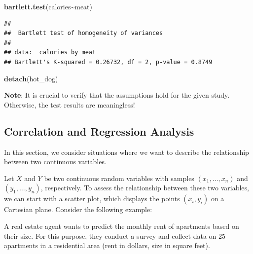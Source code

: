 \documentclass[
]{article}
\newenvironment{Shaded}{\begin{snugshade}}{\end{snugshade}}
\newcommand{\FunctionTok}[1]{\textcolor[rgb]{0.13,0.29,0.53}{\textbf{#1}}}
\newcommand{\NormalTok}[1]{#1}
\newcommand{\SpecialCharTok}[1]{\textcolor[rgb]{0.81,0.36,0.00}{\textbf{#1}}}
\begin{document}
\begin{Shaded}
\begin{Highlighting}[]
\FunctionTok{bartlett.test}\NormalTok{(calories}\SpecialCharTok{\textasciitilde{}}\NormalTok{meat)}
\end{Highlighting}
\end{Shaded}

\begin{verbatim}
## 
##  Bartlett test of homogeneity of variances
## 
## data:  calories by meat
## Bartlett's K-squared = 0.26732, df = 2, p-value = 0.8749
\end{verbatim}

\begin{Shaded}
\begin{Highlighting}[]
\FunctionTok{detach}\NormalTok{(hot\_dog)}
\end{Highlighting}
\end{Shaded}

\textbf{Note}: It is crucial to verify that the assumptions hold for the
given study. Otherwise, the test results are meaningless!

\hypertarget{correlation-and-regression-analysis}{%
\subsection{Correlation and Regression
Analysis}\label{correlation-and-regression-analysis}}

In this section, we consider situations where we want to describe the
relationship between two continuous variables.

Let \(X\) and \(Y\) be two continuous random variables with samples
\((x_1, \ldots, x_n)\) and \((y_1, \ldots, y_n)\), respectively. To
assess the relationship between these two variables, we can start with a
scatter plot, which displays the points \((x_i, y_i)\) on a Cartesian
plane. Consider the following example:

A real estate agent wants to predict the monthly rent of apartments
based on their size. For this purpose, they conduct a survey and collect
data on 25 apartments in a residential area (rent in dollars, size in
square feet).
\end{document}
